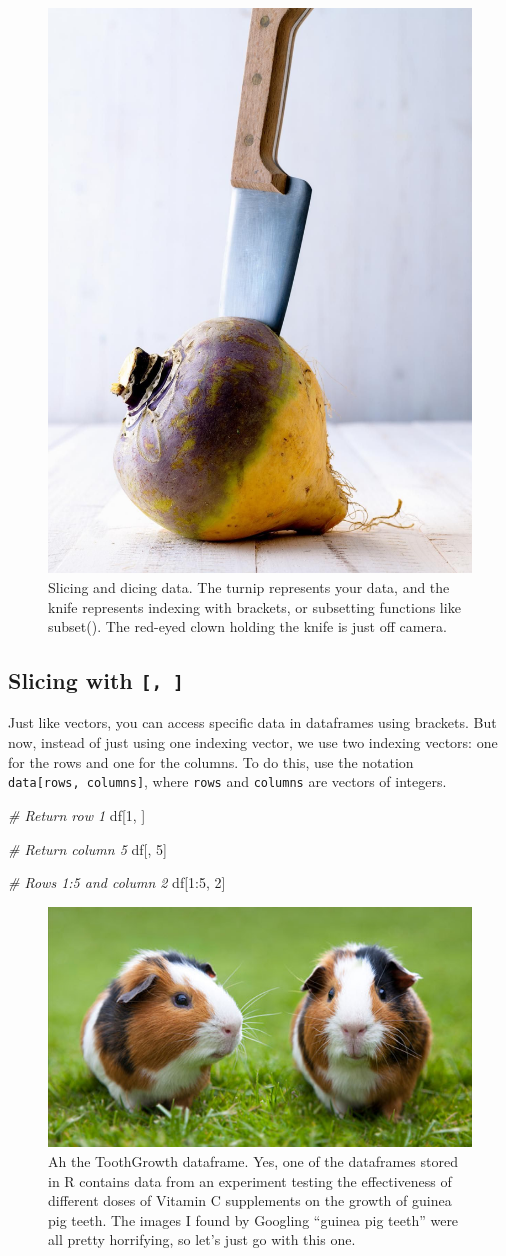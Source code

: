 \documentclass[]{book}
\newenvironment{Shaded}{\begin{snugshade}}{\end{snugshade}}
\newcommand{\DecValTok}[1]{\textcolor[rgb]{0.00,0.00,0.81}{{#1}}}
\newcommand{\CommentTok}[1]{\textcolor[rgb]{0.56,0.35,0.01}{\textit{{#1}}}}
\newcommand{\NormalTok}[1]{{#1}}
\theoremstyle{definition}
\theoremstyle{definition}
\theoremstyle{remark}
\begin{document}
\begin{figure}

{\centering \includegraphics[width=0.3\linewidth]{images/turnip} 

}

\caption{Slicing and dicing data. The turnip represents your data, and the knife represents indexing with brackets, or subsetting functions like subset(). The red-eyed clown holding the knife is just off camera.}\label{fig:unnamed-chunk-207}
\end{figure}

\subsection{\texorpdfstring{Slicing with
\texttt{{[},\ {]}}}{Slicing with {[}, {]}}}\label{slicing-with}

Just like vectors, you can access specific data in dataframes using
brackets. But now, instead of just using one indexing vector, we use two
indexing vectors: one for the rows and one for the columns. To do this,
use the notation \texttt{data{[}rows,\ columns{]}}, where \texttt{rows}
and \texttt{columns} are vectors of integers.

\begin{Shaded}
\begin{Highlighting}[]
\CommentTok{# Return row 1}
\NormalTok{df[}\DecValTok{1}\NormalTok{, ]}

\CommentTok{# Return column 5}
\NormalTok{df[, }\DecValTok{5}\NormalTok{]}

\CommentTok{# Rows 1:5 and column 2}
\NormalTok{df[}\DecValTok{1}\NormalTok{:}\DecValTok{5}\NormalTok{, }\DecValTok{2}\NormalTok{]}
\end{Highlighting}
\end{Shaded}

\begin{figure}

{\centering \includegraphics[width=0.3\linewidth]{images/guineapig} 

}

\caption{Ah the ToothGrowth dataframe. Yes, one of the dataframes stored in R contains data from an experiment testing the effectiveness of different doses of Vitamin C supplements on the growth of guinea pig teeth. The images I found by Googling ``guinea pig teeth'' were all pretty horrifying, so let's just go with this one.}\label{fig:unnamed-chunk-209}
\end{figure}
\end{document}
